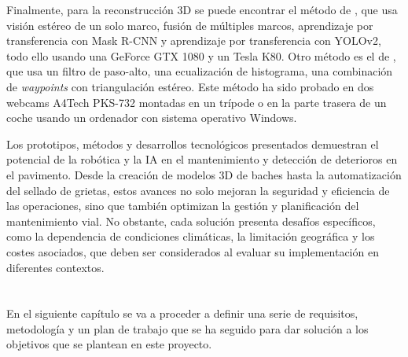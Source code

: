 Finalmente, para la reconstrucción 3D se puede encontrar el método de \cite{8788687}, que usa visión estéreo de un solo marco, fusión de múltiples marcos, aprendizaje por transferencia con Mask R-CNN y aprendizaje por transferencia con YOLOv2, todo ello usando una GeForce GTX 1080 y un Tesla K80. Otro método es el de \cite{8638822}, que usa un filtro de paso-alto, una ecualización de histograma, una combinación de \textit{waypoints} con triangulación estéreo. Este método ha sido probado en dos webcams A4Tech PKS-732 montadas en un trípode o en la parte trasera de un coche usando un ordenador con sistema operativo Windows.

Los prototipos, métodos y desarrollos tecnológicos presentados demuestran el potencial de la robótica y la \acs{IA} en el mantenimiento y detección de deterioros en el pavimento. Desde la creación de modelos 3D de baches hasta la automatización del sellado de grietas, estos avances no solo mejoran la seguridad y eficiencia de las operaciones, sino que también optimizan la gestión y planificación del mantenimiento vial. No obstante, cada solución presenta desafíos específicos, como la dependencia de condiciones climáticas, la limitación geográfica y los costes asociados, que deben ser considerados al evaluar su implementación en diferentes contextos.\\\\\\ %

En el siguiente capítulo se va a proceder a definir una serie de requisitos, metodología y un plan de trabajo que se ha seguido para dar solución a los objetivos que se plantean en este proyecto.